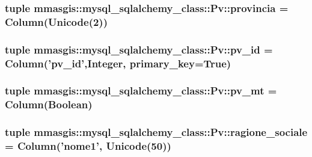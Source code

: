 \label{classmmasgis_1_1mysql__sqlalchemy__class_1_1Pv_a297d88858ae29fc942723e13262e5498}
\hypertarget{classmmasgis_1_1mysql__sqlalchemy__class_1_1Pv_aaf8ae70e686d9e89d2621538f25a1092}{
\subsubsection[{provincia}]{\setlength{\rightskip}{0pt plus 5cm}tuple {\bf mmasgis::mysql\_\-sqlalchemy\_\-class::Pv::provincia} = Column(Unicode(2))}}
\label{classmmasgis_1_1mysql__sqlalchemy__class_1_1Pv_aaf8ae70e686d9e89d2621538f25a1092}
\hypertarget{classmmasgis_1_1mysql__sqlalchemy__class_1_1Pv_a1870e0e9c1186bf785545c9c5ded2b61}{
\subsubsection[{pv\_\-id}]{\setlength{\rightskip}{0pt plus 5cm}tuple {\bf mmasgis::mysql\_\-sqlalchemy\_\-class::Pv::pv\_\-id} = Column('{\bf pv\_\-id}',Integer, primary\_\-key=True)}}
\label{classmmasgis_1_1mysql__sqlalchemy__class_1_1Pv_a1870e0e9c1186bf785545c9c5ded2b61}
\hypertarget{classmmasgis_1_1mysql__sqlalchemy__class_1_1Pv_a594818585fc4d567c939aed7046905e3}{
\subsubsection[{pv\_\-mt}]{\setlength{\rightskip}{0pt plus 5cm}tuple {\bf mmasgis::mysql\_\-sqlalchemy\_\-class::Pv::pv\_\-mt} = Column(Boolean)}}
\label{classmmasgis_1_1mysql__sqlalchemy__class_1_1Pv_a594818585fc4d567c939aed7046905e3}
\hypertarget{classmmasgis_1_1mysql__sqlalchemy__class_1_1Pv_a30f1175b6b3e41355f659cb5009579fe}{
\subsubsection[{ragione\_\-sociale}]{\setlength{\rightskip}{0pt plus 5cm}tuple {\bf mmasgis::mysql\_\-sqlalchemy\_\-class::Pv::ragione\_\-sociale} = Column('nome1', Unicode(50))}}

